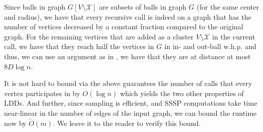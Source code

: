 Since balls in graph $G[V \setminus \mathcal{X}]$ are subsets of balls in graph $G$ (for the same center and radius), we have that every recursive call is indeed on a graph that has the number of vertices decreased by a constant fraction compared to the original graph. For the remaining vertices that are added as a cluster $V \setminus \mathcal{X}$ in the current call, we have that they reach half the vertices in $G$ in in- and out-ball w.h.p. and thus, we can use an argument as in , we have that they are at distance at most $8 D \log n$. 

It is not hard to bound via the above guarantees the number of calls that every vertex participates in by $O(\log n)$ which yields the two other properties of LDDs. And further, since sampling is efficient, and SSSP computations take time near-linear in the number of edges of the input graph, we can bound the runtime now by $\tilde{O}(m)$. We leave it to the reader to verify this bound.